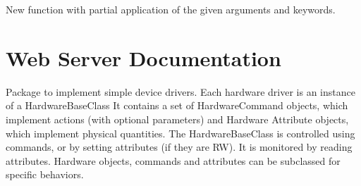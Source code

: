 \documentclass[letterpaper,10pt,english]{sphinxmanual}
\begin{document}
\label{\detokenize{apidocs:module-subrack_monitoring_point_lookup}}

\begin{fulllineitems}
\label{\detokenize{apidocs:subrack_monitoring_point_lookup.partial}}
\pysigstartsignatures
{}
\pysigstopsignatures
\sphinxAtStartPar
New function with partial application of the given arguments
and keywords.

\end{fulllineitems}


\sphinxstepscope


\chapter{Web Server Documentation}
\label{\detokenize{webserverdocs:module-HardwareBaseClass}}\label{\detokenize{webserverdocs:web-server-documentation}}\label{\detokenize{webserverdocs::doc}}
\sphinxAtStartPar
Package to implement simple device drivers.
Each hardware driver is an instance of a HardwareBaseClass
It contains a set of HardwareCommand objects, which implement
actions (with optional parameters) and
Hardware Attribute objects, which implement physical quantities.
The HardwareBaseClass is controlled using commands, or by setting
attributes (if they are RW). It is monitored by reading attributes.
Hardware objects, commands and attributes can be subclassed for specific
behaviors.
\end{document}
